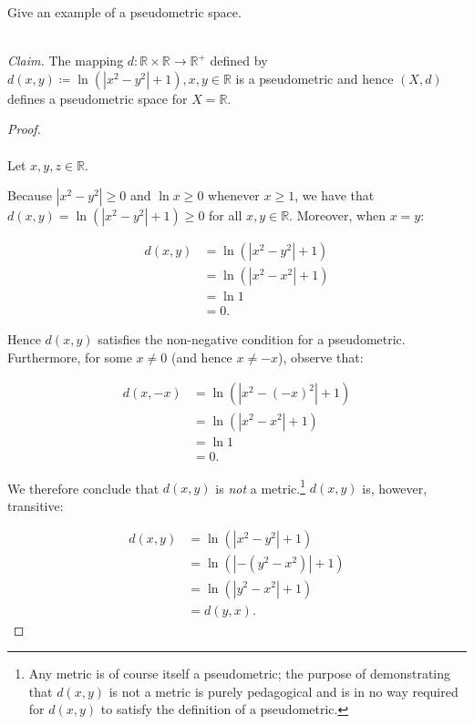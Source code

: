 Give an example of a pseudometric space.

    \ \\
    \emph{Claim.} The mapping
    $d: \mathbb{R} \times \mathbb{R} \rightarrow \mathbb{R}^+$ defined by 
    $d(x, y) \coloneqq \ln{\left(|x^2 - y^2| + 1\right)}, x,y \in \mathbb{R}$ 
    is a pseudometric and hence $(X, d)$ defines a pseudometric space for 
    $X = \mathbb{R}$.

    \begin{proof}\ \\\\
        Let $x, y, z \in \mathbb{R}$.
        
        Because $|x^2 - y^2| \ge 0$ and
        $\ln{x} \ge 0$ whenever $x \ge 1$, we have that
        $d(x, y) = \ln{\left(|x^2 - y^2| + 1\right)} \ge 0$ for all
        $x, y \in \mathbb{R}$. Moreover, when $x = y$:

        \begin{align*}
            d(x, y) &= \ln{\left(|x^2 - y^2| + 1\right)} \\
                    &= \ln{\left(|x^2 - x^2| + 1\right)} \\
                    &= \ln{1} \\
                    &= 0.
        \end{align*}

        Hence $d(x, y)$ satisfies the non-negative condition for a pseudometric. 
        Furthermore, for some $x \neq 0$ (and hence $x \neq -x$), observe that:

        \begin{align*}
            d(x, -x) &= \ln{\left(|x^2 - (-x)^2| + 1\right)} \\
                     &= \ln{\left(|x^2 - x^2| + 1\right)} \\
                     &= \ln{1} \\
                     &= 0.
        \end{align*}

        We therefore conclude that $d(x,y)$ is \emph{not} a metric.\footnote{
            Any metric is of course itself a pseudometric; the purpose of
            demonstrating that $d(x, y)$ is not a metric is purely pedagogical
            and is in no way required for $d(x, y)$ to satisfy the definition of
            a pseudometric.
        } $d(x, y)$ is, however, transitive:

        \begin{align*}
            d(x, y) &= \ln{\left(|x^2 - y^2| + 1\right)} \\
                    &= \ln{\left(|-(y^2 - x^2)| + 1\right)} \\
                    &= \ln{\left(|y^2 - x^2| + 1\right)} \\
                    &= d(y, x).
        \end{align*}


\end{proof}
